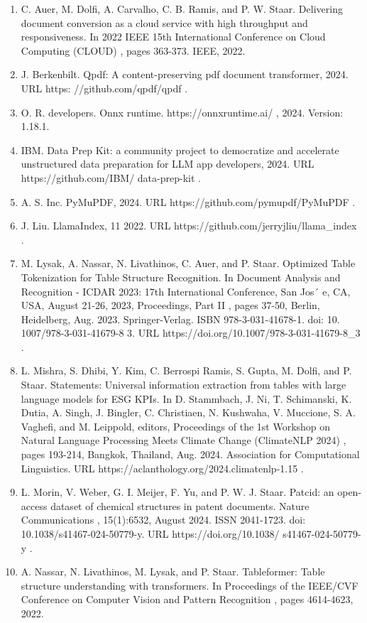 \begin{enumerate}
\item C. Auer, M. Dolfi, A. Carvalho, C. B. Ramis, and P. W. Staar. Delivering document conversion as a cloud service with high throughput and responsiveness. In 2022 IEEE 15th International Conference on Cloud Computing (CLOUD) , pages 363-373. IEEE, 2022.
\item J. Berkenbilt. Qpdf: A content-preserving pdf document transformer, 2024. URL https: //github.com/qpdf/qpdf .
\item O. R. developers. Onnx runtime. https://onnxruntime.ai/ , 2024. Version: 1.18.1.
\item IBM. Data Prep Kit: a community project to democratize and accelerate unstructured data preparation for LLM app developers, 2024. URL https://github.com/IBM/ data-prep-kit .
\item A. S. Inc. PyMuPDF, 2024. URL https://github.com/pymupdf/PyMuPDF .
\item J. Liu. LlamaIndex, 11 2022. URL https://github.com/jerryjliu/llama\_index .
\item M. Lysak, A. Nassar, N. Livathinos, C. Auer, and P. Staar. Optimized Table Tokenization for Table Structure Recognition. In Document Analysis and Recognition - ICDAR 2023: 17th International Conference, San Jos´ e, CA, USA, August 21-26, 2023, Proceedings, Part II , pages 37-50, Berlin, Heidelberg, Aug. 2023. Springer-Verlag. ISBN 978-3-031-41678-1. doi: 10. 1007/978-3-031-41679-8 3. URL https://doi.org/10.1007/978-3-031-41679-8\_3 .
\item L. Mishra, S. Dhibi, Y. Kim, C. Berrospi Ramis, S. Gupta, M. Dolfi, and P. Staar. Statements: Universal information extraction from tables with large language models for ESG KPIs. In D. Stammbach, J. Ni, T. Schimanski, K. Dutia, A. Singh, J. Bingler, C. Christiaen, N. Kushwaha, V. Muccione, S. A. Vaghefi, and M. Leippold, editors, Proceedings of the 1st Workshop on Natural Language Processing Meets Climate Change (ClimateNLP 2024) , pages 193-214, Bangkok, Thailand, Aug. 2024. Association for Computational Linguistics. URL https://aclanthology.org/2024.climatenlp-1.15 .
\item L. Morin, V. Weber, G. I. Meijer, F. Yu, and P. W. J. Staar. Patcid: an open-access dataset of chemical structures in patent documents. Nature Communications , 15(1):6532, August 2024. ISSN 2041-1723. doi: 10.1038/s41467-024-50779-y. URL https://doi.org/10.1038/ s41467-024-50779-y .
\item A. Nassar, N. Livathinos, M. Lysak, and P. Staar. Tableformer: Table structure understanding with transformers. In Proceedings of the IEEE/CVF Conference on Computer Vision and Pattern Recognition , pages 4614-4623, 2022.

\end{enumerate}
